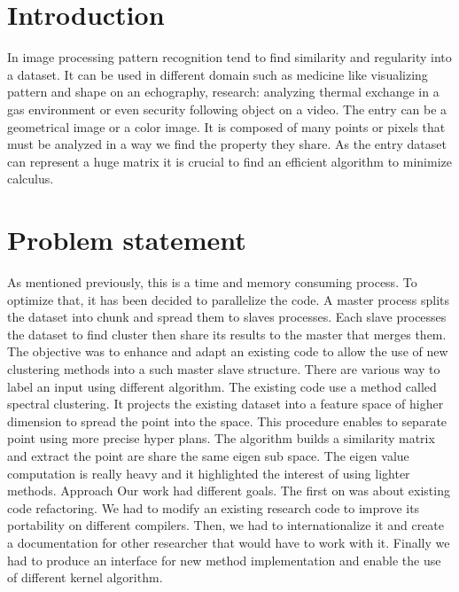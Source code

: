 \section*{Introduction}
In image processing pattern recognition tend to find similarity and regularity into a dataset. It can be  used in different domain such as medicine like visualizing pattern and shape on an echography, research: analyzing thermal exchange in a gas environment or even security following object on a video. The entry can be a geometrical image or a color image. It is composed of many points or pixels that must be analyzed in a way we find the property they share. As the entry dataset can represent a huge matrix it is crucial to find an efficient algorithm to minimize calculus.

\section*{Problem statement}
 As mentioned previously, this is a time and memory consuming process. To optimize that, it has been decided to parallelize the code. A master process splits the dataset into chunk and spread them to slaves processes. Each slave processes the dataset to find cluster then share its results to the master that merges them. The objective was to enhance and adapt an existing code to allow the use of new clustering methods into a such master slave structure. 
There are various way to label an input using different algorithm. The existing code use a method called spectral clustering. It projects the existing dataset into a feature space of higher dimension to spread the point into the space. This procedure enables to separate point using more precise hyper plans. The algorithm builds a similarity matrix and extract the point are share the same eigen sub space. The eigen value computation is really heavy and it highlighted the interest of using lighter methods.
Approach
Our work had different goals. The first on was about existing code refactoring. We had to modify an existing research code to improve its portability on different compilers. Then, we had to internationalize it and create a documentation for other researcher that would have to work with it. Finally we had to produce an interface for new method implementation and enable the use of different kernel algorithm. 



\begin{figure}[H] %
\caption{}
\label{fig:speciation}
\end{figure}



